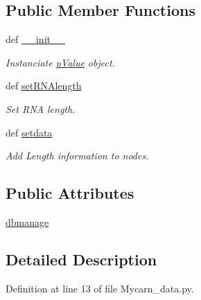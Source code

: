 \subsection*{\-Public \-Member \-Functions}
\begin{DoxyCompactItemize}
\item 
def \hyperlink{classirna_1_1David2tulip_1_1Mycarn__data_1_1Mycarn__data_a5418e4a88243b4875b6c06919cc3f568}{\-\_\-\-\_\-init\-\_\-\-\_\-}
\begin{DoxyCompactList}\small\item\em \-Instanciate \hyperlink{namespaceirna_1_1David2tulip_1_1pValue}{p\-Value} object. \end{DoxyCompactList}\item 
def \hyperlink{classirna_1_1David2tulip_1_1Mycarn__data_1_1Mycarn__data_a4f0ac0ca770ec1d352852d659e195e43}{set\-R\-N\-Alength}
\begin{DoxyCompactList}\small\item\em \-Set \-R\-N\-A length. \end{DoxyCompactList}\item 
def \hyperlink{classirna_1_1David2tulip_1_1Mycarn__data_1_1Mycarn__data_a3a00d4879147f16e5d38ec9db23ace20}{setdata}
\begin{DoxyCompactList}\small\item\em \-Add \-Length information to nodes. \end{DoxyCompactList}\end{DoxyCompactItemize}
\subsection*{\-Public \-Attributes}
\begin{DoxyCompactItemize}
\item 
\hyperlink{classirna_1_1David2tulip_1_1Mycarn__data_1_1Mycarn__data_a91a5fed000eb660fe946407944c76730}{dbmanage}
\end{DoxyCompactItemize}


\subsection{\-Detailed \-Description}


\-Definition at line 13 of file \-Mycarn\-\_\-data.\-py.



